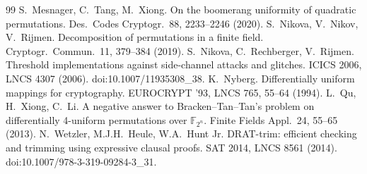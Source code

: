 \documentclass[11pt]{article}
\theoremstyle{definition}
\newcommand{\F}{\mathbb{F}}
\begin{document}
\begin{thebibliography}{99}
 S.~Mesnager, C.~Tang, M.~Xiong. On the boomerang uniformity of quadratic
permutations. Des.\ Codes Cryptogr.\ 88, 2233--2246 (2020).
 S.~Nikova, V.~Nikov, V.~Rijmen. Decomposition of permutations in a finite field.
Cryptogr.\ Commun.\ 11, 379--384 (2019).
 S.~Nikova, C.~Rechberger, V.~Rijmen. Threshold implementations against side-channel
attacks and glitches. ICICS 2006, LNCS 4307 (2006). doi:10.1007/11935308\_38.
 K.~Nyberg. Differentially uniform mappings for cryptography. EUROCRYPT '93, LNCS 765,
55--64 (1994).
 L.~Qu, H.~Xiong, C.~Li. A negative answer to Bracken--Tan--Tan's problem on
differentially 4-uniform permutations over $\F_{2^n}$. Finite Fields Appl.\ 24, 55--65 (2013).
 N.~Wetzler, M.J.H.~Heule, W.A.~Hunt Jr. DRAT-trim: efficient checking and trimming
using expressive clausal proofs. SAT 2014, LNCS 8561 (2014). doi:10.1007/978-3-319-09284-3\_31.
\end{thebibliography}
\end{document}
